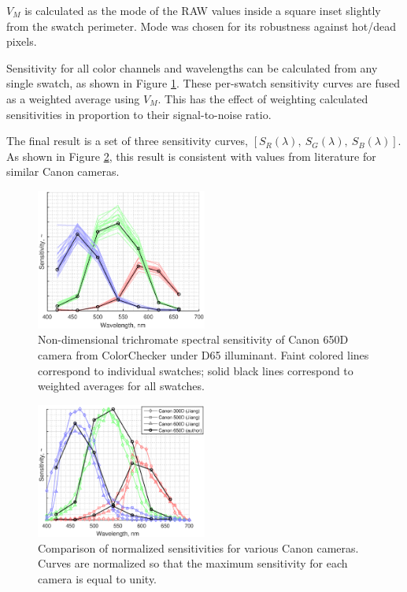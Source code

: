 \documentclass[twocolumn,10pt]{asme2ej}
\newcommand{\id}{\hspace{6 mm}}
\begin{document}
$V_M$ is calculated as the mode of the RAW values inside a square inset slightly from the swatch perimeter. Mode was chosen for its robustness against hot/dead pixels.

\id Sensitivity for all color channels and wavelengths can be calculated from any single swatch, as shown in Figure \ref{canon_650d_sensitivity}. These per-swatch sensitivity curves are fused as a weighted average using $V_M$. This has the effect of weighting calculated sensitivities in proportion to their signal-to-noise ratio.

\id The final result is a set of three sensitivity curves, $\left[ S_R(\lambda), \ S_G(\lambda), \ S_B(\lambda) \right]$. As shown in Figure \ref{camera_spectral_sensitivities}, this result is consistent with values from literature for similar Canon cameras.

\begin{figure}
\centering
\includegraphics[width=0.5\textwidth]{canon_650d_sensitivity.eps}
\caption{Non-dimensional trichromate spectral sensitivity of Canon 650D camera from ColorChecker under D65 illuminant. Faint colored lines correspond to individual swatches; solid black lines correspond to weighted averages for all swatches.}
\label{canon_650d_sensitivity}
\end{figure}

\begin{figure}
\centering
\includegraphics[width=0.5\textwidth]{camera_spectral_sensitivities.eps}
\caption{Comparison of normalized sensitivities for various Canon cameras. \cite{Jiang} Curves are normalized so that the maximum sensitivity for each camera is equal to unity.}
\label{camera_spectral_sensitivities}
\end{figure}
\end{document}
